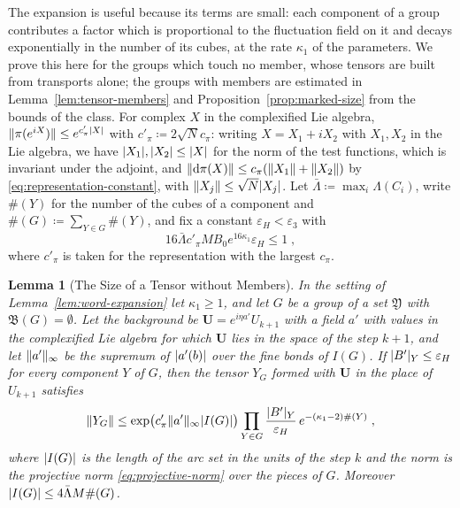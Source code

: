 \documentclass[11pt]{preprint}
\newcommand{\dd}{\mathrm{d}}
\DeclarePairedDelimiter{\abs}{\lvert}{\rvert}
\DeclarePairedDelimiter{\norm}{\lVert}{\rVert}
\numberwithin{equation}{section}
\newtheorem{lemma}[theorem]{Lemma}
\theoremstyle{definition}
\theoremstyle{remark}
\theoremstyle{plain}
\begin{document}
The expansion is useful because its terms are small: each component of a group contributes a factor which is proportional to the fluctuation field on it and decays exponentially in the number of its cubes, at the rate $\kappa_1$ of the parameters. We prove this here for the groups which touch no member, whose tensors are built from transports alone; the groups with members are estimated in Lemma~\ref{lem:tensor-members} and Proposition~\ref{prop:marked-size} from the bounds of the class. For complex $X$ in the complexified Lie algebra, $\norm{\pi(e^{iX})} \leq e^{c'_\pi\abs X}$ with $c'_\pi \coloneqq 2\sqrt Nc_\pi$: writing $X = X_1 + iX_2$ with $X_1, X_2$ in the Lie algebra, we have $\abs{X_1}, \abs{X_2} \leq \abs X$ for the norm of the test functions, which is invariant under the adjoint, and $\norm{\dd\pi(X)} \leq c_\pi(\norm{X_1} + \norm{X_2})$ by \eqref{eq:representation-constant}, with $\norm{X_j} \leq \sqrt N\abs{X_j}$. Let $\bar\Lambda \coloneqq \max_i\Lambda(C_i)$, write $\#(Y)$ for the number of the cubes of a component and $\#(G) \coloneqq \sum_{Y \in G}\#(Y)$, and fix a constant $\varepsilon_H < \varepsilon_3$ with
\begin{equation}\label{eq:epsilon-h}
    16\bar\Lambda c'_\pi MB_0e^{16\kappa_1}\varepsilon_H \leq 1\;,
\end{equation}
where $c'_\pi$ is taken for the representation with the largest $c_\pi$.

\begin{lemma}[The Size of a Tensor without Members]\label{lem:tensor-size}
In the setting of Lemma~\ref{lem:word-expansion} let $\kappa_1 \geq 1$, and let $G$ be a group of a set $\mathfrak Y$ with $\mathfrak B(G) = \emptyset$. Let the background be $\mathbf U = e^{i\eta a'}U_{k+1}$ with a field $a'$ with values in the complexified Lie algebra for which $\mathbf U$ lies in the space of the step $k + 1$, and let $\norm{a'}_\infty$ be the supremum of $\abs{a'(b)}$ over the fine bonds of $I(G)$. If $\abs{B'}_Y \leq \varepsilon_H$ for every component $Y$ of $G$, then the tensor $Y_G$ formed with $\mathbf U$ in the place of $U_{k+1}$ satisfies
\begin{equation}\label{eq:tensor-size}
    \norm{Y_G} \leq \exp\bigl(c'_\pi\norm{a'}_\infty\abs{I(G)}\bigr)\prod_{Y \in G}\frac{\abs{B'}_Y}{\varepsilon_H}\,e^{-(\kappa_1 - 2)\#(Y)}\;,
\end{equation}
where $\abs{I(G)}$ is the length of the arc set in the units of the step $k$ and the norm is the projective norm \eqref{eq:projective-norm} over the pieces of $G$. Moreover $\abs{I(G)} \leq 4\bar\Lambda M\#(G)$.
\end{lemma}
\end{document}
